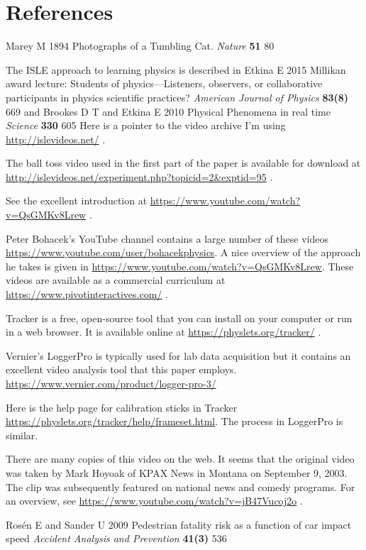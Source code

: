 \documentclass[12pt]{iopart}
\begin{document}

\section*{References}
\begin{thebibliography}{99}

Marey M
1894
Photographs of a Tumbling Cat. 
{\it Nature }
{\bf 51} 
80

The ISLE approach to learning physics is described in 
Etkina E 
2015
Millikan award lecture: Students of physics—Listeners, observers, or collaborative participants in physics scientific practices?
{\it American Journal of Physics}
{\bf 83(8)}
669
and 
Brookes D T and Etkina E
2010
Physical Phenomena in real time
{\it Science}
{\bf 330}
605
Here is a pointer to the video archive I'm using \url{http://islevideos.net/} .
  
The ball toss video used in the first part of the paper is available for download at \url{http://islevideos.net/experiment.php?topicid=2&exptid=95} .

See the excellent introduction at 
\url{https://www.youtube.com/watch?v=QsGMKv8Lrew} .

 Peter Bohacek's YouTube channel contains a large number of these videos \url{https://www.youtube.com/user/bohacekphysics}.  
A nice overview of the approach he takes is given in \url{https://www.youtube.com/watch?v=QsGMKv8Lrew}. 
These videos are available as a commercial curriculum at \url{https://www.pivotinteractives.com/} .

 Tracker is a free, open-source tool that you can install on your computer or run in a web browser.  It is available online at \url{https://physlets.org/tracker/} .

 Vernier's LoggerPro is typically used for lab data acquisition but it contains an excellent video analysis tool that this paper employs. 
\url{https://www.vernier.com/product/logger-pro-3/}

 Here is the help page for calibration sticks in Tracker \url{https://physlets.org/tracker/help/frameset.html}.  The process in LoggerPro is similar.

There are many copies of this video on the web.  It seems that the original video was taken by Mark Hoyoak of KPAX News in Montana on September 9, 2003.  The clip was subsequently featured on national news and comedy programs.  For an overview, see \url{https://www.youtube.com/watch?v=jB47Vucoj2o} .
   
Rosén E and Sander U
2009
Pedestrian fatality risk as a function of car impact speed
{\it Accident Analysis and Prevention}
\textbf{41(3)} 
536


\end{thebibliography}
\end{document}
